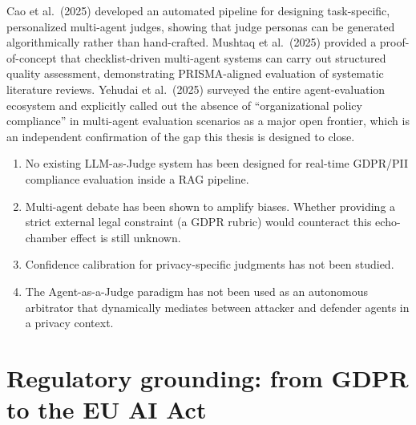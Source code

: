 \documentclass[12pt,a4paper]{report}
\begin{document}
Cao et al.\ (2025) developed an automated pipeline for designing task-specific, personalized multi-agent judges, showing that judge personas can be generated algorithmically rather than hand-crafted. Mushtaq et al.\ (2025) provided a proof-of-concept that checklist-driven multi-agent systems can carry out structured quality assessment, demonstrating PRISMA-aligned evaluation of systematic literature reviews. Yehudai et al.\ (2025) surveyed the entire agent-evaluation ecosystem and explicitly called out the absence of ``organizational policy compliance'' in multi-agent evaluation scenarios as a major open frontier, which is an independent confirmation of the gap this thesis is designed to close.

\begin{gapbox}
\begin{enumerate}[leftmargin=1.5em, itemsep=3pt]
  \item No existing LLM-as-Judge system has been designed for real-time GDPR/PII compliance evaluation inside a RAG pipeline.
  \item Multi-agent debate has been shown to amplify biases. Whether providing a strict external legal constraint (a GDPR rubric) would counteract this echo-chamber effect is still unknown.
  \item Confidence calibration for privacy-specific judgments has not been studied.
  \item The Agent-as-a-Judge paradigm has not been used as an autonomous arbitrator that dynamically mediates between attacker and defender agents in a privacy context.
\end{enumerate}
\end{gapbox}



\newpage
\section{Regulatory grounding: from GDPR to the EU AI Act}
\label{sec:regulatory}
\end{document}
